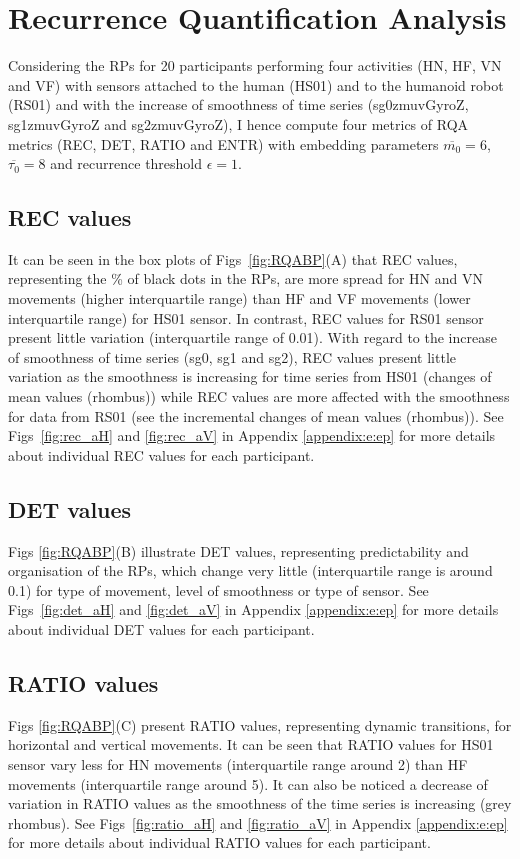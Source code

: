 \newpage
\section{Recurrence Quantification Analysis} \label{ch6:rqas}
Considering the RPs for 20 participants performing four activities 
(HN, HF, VN and VF) with sensors attached to the human (HS01) and to the 
humanoid robot (RS01) and with the increase of smoothness of time series 
(sg0zmuvGyroZ, sg1zmuvGyroZ and sg2zmuvGyroZ), 
I hence compute four metrics of RQA metrics (REC, DET, RATIO and ENTR) with 
embedding parameters $\overline{m_0}=6$, $\overline{\tau_0}=8$ and 
recurrence threshold $\epsilon=1$.
 
\subsection*{REC values}
It can be seen in the box plots of Figs~\ref{fig:RQABP}(A) that REC values, 
representing the \% of black dots in the RPs, 
are more spread for HN and VN movements (higher interquartile range) 
than HF and VF movements (lower interquartile range) for HS01 sensor. 
In contrast, REC values for RS01 sensor present little variation 
(interquartile range of 0.01).
With regard to the increase of smoothness of time series 
(sg0, sg1 and sg2), REC values present little 
variation as the smoothness is increasing for time series from HS01 
(changes of mean values (rhombus)) while REC values are more affected with 
the smoothness for data from RS01 
(see the incremental changes of mean values (rhombus)).
See Figs~\ref{fig:rec_aH} and \ref{fig:rec_aV} in Appendix \ref{appendix:e:ep} 
for more details about individual REC values for each participant.

\subsection*{DET values}
Figs \ref{fig:RQABP}(B) illustrate DET values, 
representing predictability and organisation of the RPs, 
which change very little (interquartile range is around 0.1) 
for type of movement, level of smoothness or type of sensor.
See Figs~\ref{fig:det_aH} and \ref{fig:det_aV} in Appendix \ref{appendix:e:ep} 
for more details about individual DET values for each participant.

\subsection*{RATIO values}
Figs \ref{fig:RQABP}(C) present RATIO values, representing dynamic transitions, 
for horizontal and vertical movements.
It can be seen that RATIO values for HS01 sensor vary less 
for HN movements (interquartile range around 2)
than HF movements (interquartile range around 5).
It can also be noticed a decrease of variation in RATIO values as the 
smoothness of the time series is increasing (grey rhombus).
See Figs~\ref{fig:ratio_aH} and \ref{fig:ratio_aV} in Appendix 
\ref{appendix:e:ep} 
for more details about individual RATIO values for each participant.

